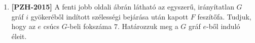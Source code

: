 \documentclass[a4paper,12pt]{article}
\begin{document}
\begin{enumerate}
        \begin{minipage}{6in}
            \centering
            \raisebox{-0.5\height}{} \hspace{1in}
            \raisebox{-0.5\height}{}
        \end{minipage}
        
        \item \textbf{[PZH-2015]} A fenti jobb oldali ábrán látható az egyszerű, irányítatlan $G$ gráf $i$ gyökeréből indított szélességi bejárása után kapott $F$ feszítőfa. Tudjuk, hogy az $e$ csúcs $G$-beli fokszáma $7$. Határozzuk meg a $G$ gráf $e$-ből induló éleit.
        \end{enumerate}
        
    
\end{document}
